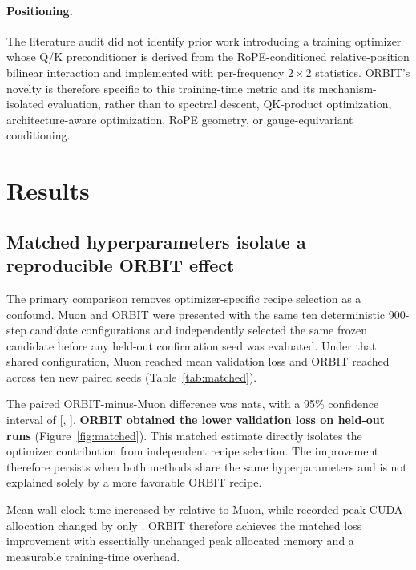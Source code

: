 \documentclass[10pt]{article}
\begin{document}
\paragraph{Positioning.}
The literature audit did not identify prior work introducing a training optimizer whose Q/K
preconditioner is derived from the RoPE-conditioned relative-position bilinear interaction
and implemented with per-frequency $2\times2$ statistics. ORBIT's novelty is therefore
specific to this training-time metric and its mechanism-isolated evaluation, rather than to
spectral descent, QK-product optimization, architecture-aware optimization, RoPE geometry,
or gauge-equivariant conditioning.



\section{Results}

\subsection{Matched hyperparameters isolate a reproducible ORBIT effect}
The primary comparison removes optimizer-specific recipe selection as a confound. Muon and
ORBIT were presented with the same ten deterministic 900-step candidate configurations and
independently selected the same frozen candidate before any held-out confirmation seed was
evaluated. Under that shared configuration, Muon reached mean validation loss
\MatchedMuonLoss{} and ORBIT reached \MatchedOrbitLoss{} across ten new paired seeds
(Table~\ref{tab:matched}).

The paired ORBIT-minus-Muon difference was \MatchedDelta{} nats, with a 95\% confidence
interval of [\MatchedCILow{}, \MatchedCIHigh{}].
\textbf{ORBIT obtained the lower validation loss on \MatchedWins{} held-out runs}
(Figure~\ref{fig:matched}). This matched estimate directly isolates the optimizer contribution from independent recipe
selection. The improvement therefore persists when both methods share the same
hyperparameters and is not explained solely by a more favorable ORBIT recipe.

Mean wall-clock time increased by \MatchedRuntimeOverhead{} relative to Muon, while
recorded peak CUDA allocation changed by only \MatchedMemoryOverhead{}. ORBIT therefore
achieves the matched loss improvement with essentially unchanged peak allocated memory and
a measurable training-time overhead.
\end{document}
